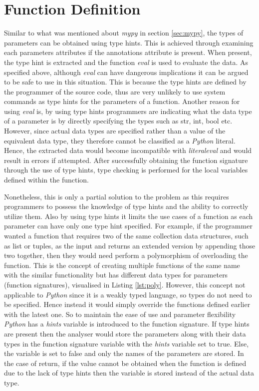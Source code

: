 \documentclass{l4proj}
\begin{document}
\section{Function Definition}
Similar to what was mentioned about \emph{mypy} in section \ref{sec:mypy}, the types of parameters can be obtained using type hints. This is achieved through examining each parameters attributes if the annotations attribute is present. When present, the type hint is extracted and the function \textit{eval} is used to evaluate the data. As specified above, although \textit{eval} can have dangerous implications it can be argued to be safe to use in this situation. This is because the type hints are defined by the programmer of the source code, thus are very unlikely to use system commands as type hints for the parameters of a function. Another reason for using \textit{eval} is, by using type hints programmers are indicating what the data type of a parameter is by directly specifying the types such as str, int, bool etc. However, since actual data types are specified rather than a value of the equivalent data type, they therefore cannot be classified as a \emph{Python} literal. Hence, the extracted data would become incompatible with \textit{literal\textunderscore eval} and would result in errors if attempted. After successfully obtaining the function signature through the use of type hints, type checking is performed for the local variables defined within the function.

Nonetheless, this is only a partial solution to the problem as this requires programmers to possess the knowledge of type hints and the ability to correctly utilize them. Also by using type hints it limits the use cases of a function as each parameter can have only one type hint specified. For example, if the programmer wanted a function that requires two of the same collection data structures, such as list or tuples, as the input and returns an extended version by appending those two together, then they would need perform a polymorphism of overloading the function. This is the concept of creating multiple functions of the same name with the similar functionality but has different data types for parameters (function signatures), visualised in Listing \ref{lst:poly}. However, this concept not applicable to \emph{Python} since it is a weakly typed language, so types do not need to be specified. Hence instead it would simply override the functions defined earlier with the latest one. So to maintain the ease of use and parameter flexibility \emph{Python} has a \textit{hints} variable is introduced to the function signature. If type hints are present then the analyser would store the parameters along with their data types in the function signature variable with the \textit{hints} variable set to true. Else, the variable is set to false and only the names of the parameters are stored. In the case of return, if the value cannot be obtained when the function is defined due to the lack of type hints then the variable is stored instead of the actual data type.
\end{document}
